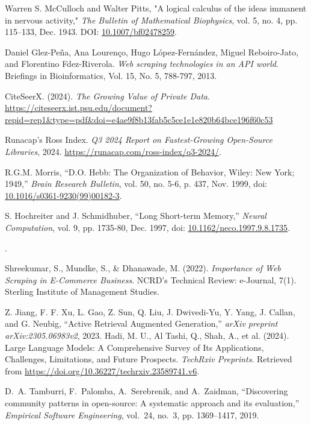 \begin{thebibliography}{1}
Warren S. McCulloch and Walter Pitts, 
"A logical calculus of the ideas immanent in nervous activity," 
\textit{The Bulletin of Mathematical Biophysics}, 
vol. 5, no. 4, pp. 115--133, Dec. 1943. 
DOI: \href{https://doi.org/10.1007/bf02478259}{10.1007/bf02478259}.

Daniel Glez-Peña, Ana Lourenço, Hugo López-Fernández, Miguel Reboiro-Jato, and Florentino Fdez-Riverola. 
\textit{Web scraping technologies in an API world}. Briefings in Bioinformatics, Vol. 15, No. 5, 788-797, 2013.

CiteSeerX. (2024). \textit{The Growing Value of Private Data}. \url{https://citeseerx.ist.psu.edu/document?repid=rep1&type=pdf&doi=e4ae9f8b13fab5c5ce1e1e820b64bce196f60c53}

Runacap's Ross Index. \emph{Q3 2024 Report on Fastest-Growing Open-Source Libraries}, 2024. \url{https://runacap.com/ross-index/q3-2024/}.


R.G.M. Morris, ``D.O. Hebb: The Organization of Behavior, Wiley: New York; 1949,'' \textit{Brain Research Bulletin}, vol. 50, no. 5-6, p. 437, Nov. 1999, doi: \href{https://doi.org/10.1016/s0361-9230(99)00182-3}{10.1016/s0361-9230(99)00182-3}.

S. Hochreiter and J. Schmidhuber, ``Long Short-term Memory,'' \textit{Neural Computation}, vol. 9, pp. 1735-80, Dec. 1997, doi: \href{https://doi.org/10.1162/neco.1997.9.8.1735}{10.1162/neco.1997.9.8.1735}.



   .
    
Shreekumar, S., Mundke, S., \& Dhanawade, M. (2022). \textit{Importance of Web Scraping in E-Commerce Business}. NCRD’s Technical Review: e-Journal, 7(1). Sterling Institute of Management Studies.

    Z. Jiang, F. F. Xu, L. Gao, Z. Sun, Q. Liu, J. Dwivedi-Yu, Y. Yang, J. Callan, and G. Neubig, ``Active Retrieval Augmented Generation,'' \emph{arXiv preprint arXiv:2305.06983v2}, 2023.
Hadi, M. U., Al Tashi, Q., Shah, A., et al. (2024). Large Language Models: A Comprehensive Survey of Its Applications, Challenges, Limitations, and Future Prospects. \textit{TechRxiv Preprints}. Retrieved from \url{https://doi.org/10.36227/techrxiv.23589741.v6}.

D.~A. Tamburri, F.~Palomba, A.~Serebrenik, and A.~Zaidman, ``Discovering community patterns in open-source: A systematic approach and its evaluation,'' \emph{Empirical Software Engineering}, vol.~24, no.~3, pp. 1369–1417, 2019.


\end{thebibliography}


